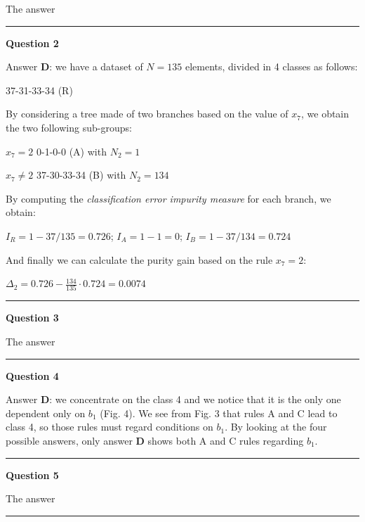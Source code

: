 \documentclass[
]{article}
\begin{document}
The answer

\begin{center}\rule{0.5\linewidth}{0.5pt}\end{center}

\textbf{Question 2}

Answer \textbf{D}: we have a dataset of \(N=135\) elements, divided in 4
classes as follows:

37-31-33-34 (R)

By considering a tree made of two branches based on the value of
\(x_7\), we obtain the two following sub-groups:

\(x_7=2\) 0-1-0-0 (A) with \(N_2=1\)

\(x_7 \neq 2\) 37-30-33-34 (B) with \(N_2=134\)

By computing the \emph{classification error impurity measure} for each
branch, we obtain:

\(I_R=1-37/135=0.726\); \(I_A=1-1=0\); \(I_B=1-37/134=0.724\)

And finally we can calculate the purity gain based on the rule
\(x_7=2\):

\(\Delta_2=0.726-\frac{134}{135}\cdot 0.724=0.0074\)

\begin{center}\rule{0.5\linewidth}{0.5pt}\end{center}

\textbf{Question 3}

The answer

\begin{center}\rule{0.5\linewidth}{0.5pt}\end{center}

\textbf{Question 4}

Answer \textbf{D}: we concentrate on the class 4 and we notice that it
is the only one dependent only on \(b_1\) (Fig. 4). We see from Fig. 3
that rules A and C lead to class 4, so those rules must regard
conditions on \(b_1\). By looking at the four possible answers, only
answer \textbf{D} shows both A and C rules regarding \(b_1\).

\begin{center}\rule{0.5\linewidth}{0.5pt}\end{center}

\textbf{Question 5}

The answer

\begin{center}\rule{0.5\linewidth}{0.5pt}\end{center}
\end{document}
